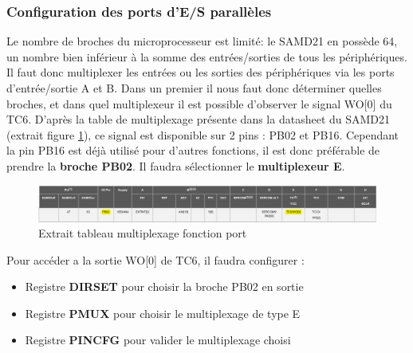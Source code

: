 \documentclass[a4paper]{article}
\begin{document}
	\subsubsection{Configuration des ports d'E/S parallèles} 
	Le nombre de broches du microprocesseur est limité: le SAMD21 en possède 64, un nombre bien inférieur à la somme des entrées/sorties de tous les périphériques. Il faut donc multiplexer les entrées ou les sorties des périphériques via les ports d’entrée/sortie A et B. Dans un premier il nous faut donc déterminer quelles broches, et dans quel multiplexeur il est possible d’observer le signal WO[0] du TC6. D’après la table de multiplexage présente dans la datasheet du SAMD21 (extrait figure \ref{fig:MUX_io}), ce signal est disponible sur 2 pins : PB02 et PB16. Cependant la pin PB16 est déjà utilisé pour d’autres fonctions, il est donc préférable de prendre la \textbf{broche PB02}. Il faudra sélectionner le \textbf{multiplexeur E}.
	\begin{figure}[H]
		\centering
		\includegraphics[width=\linewidth]{MUX_io}
		\caption{Extrait tableau multiplexage fonction port}
		\label{fig:MUX_io}
	\end{figure}
    Pour accéder a la sortie WO[0] de TC6, il faudra configurer :
    \begin{itemize}
		\item {Registre \bf DIRSET} pour choisir la broche PB02 en sortie
		\item {Registre \bf PMUX} pour choisir le multiplexage de type E
		\item {Registre \bf PINCFG} pour valider le multiplexage choisi
	\end{itemize}
	\newpage
\end{document}
